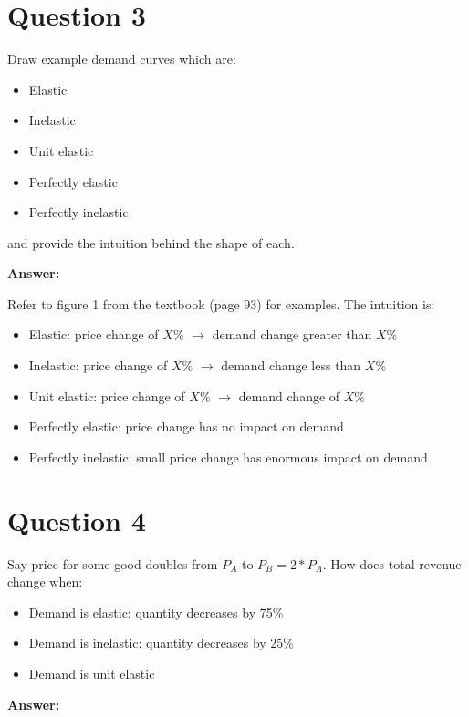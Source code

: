 \documentclass[12pt]{article}
\begin{document}
\section*{Question 3}
Draw example demand curves which are:
\begin{itemize}
 \item Elastic
 \item Inelastic
 \item Unit elastic
 \item Perfectly elastic
 \item Perfectly inelastic
\end{itemize}
and provide the intuition behind the shape of each.

\vspace{2mm}

\textbf{Answer:}

\vspace{2mm}

Refer to figure 1 from the textbook (page 93) for examples. The intuition is:
\begin{itemize}
    \item Elastic: price change of $X\%$ $\to$ demand change greater than $X\%$ 
    \item Inelastic: price change of $X\%$ $\to$ demand change less than $X\%$ 
    \item Unit elastic: price change of $X\%$ $\to$ demand change of $X\%$
    \item Perfectly elastic: price change has no impact on demand
    \item Perfectly inelastic: small price change has enormous impact on demand
   \end{itemize}

\vspace{2mm}

\section*{Question 4}
Say price for some good doubles from $P_A$ to $P_B = 2*P_A$. How does total revenue change when:
    \begin{itemize}
        \item Demand is elastic: quantity decreases by 75\%
        \item Demand is inelastic: quantity decreases by 25\%
        \item Demand is unit elastic
    \end{itemize}


\textbf{Answer:}
\end{document}
